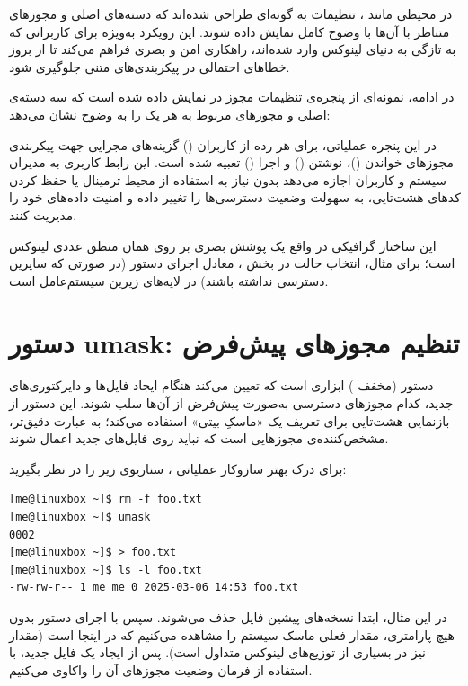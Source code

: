در محیطی مانند ، تنظیمات به گونه‌ای طراحی شده‌اند که دسته‌های اصلی و مجوزهای متناظر با آن‌ها با وضوح کامل نمایش داده شوند. این رویکرد به‌ویژه برای کاربرانی که به تازگی به دنیای لینوکس وارد شده‌اند، راهکاری امن و بصری فراهم می‌کند تا از بروز خطاهای احتمالی در پیکربندی‌های متنی جلوگیری شود.

در ادامه، نمونه‌ای از پنجره‌ی تنظیمات مجوز در  نمایش داده شده است که سه دسته‌ی اصلی و مجوزهای مربوط به هر یک را به وضوح نشان می‌دهد:


در این پنجره عملیاتی، برای هر رده از کاربران () گزینه‌های مجزایی جهت پیکربندی مجوزهای خواندن ()، نوشتن () و اجرا () تعبیه شده است. این رابط کاربری به مدیران سیستم و کاربران اجازه می‌دهد بدون نیاز به استفاده از محیط ترمینال یا حفظ کردن کدهای هشت‌تایی، به سهولت وضعیت دسترسی‌ها را تغییر داده و امنیت داده‌های خود را مدیریت کنند.

این ساختار گرافیکی در واقع یک پوشش بصری بر روی همان منطق عددی لینوکس است؛ برای مثال، انتخاب حالت  در بخش ، معادل اجرای دستور  (در صورتی که سایرین دسترسی نداشته باشند) در لایه‌های زیرین سیستم‌عامل است.

\section{دستور umask: تنظیم مجوزهای پیش‌فرض}

دستور  (مخفف ) ابزاری است که تعیین می‌کند هنگام ایجاد فایل‌ها و دایرکتوری‌های جدید، کدام مجوزهای دسترسی به‌صورت پیش‌فرض از آن‌ها سلب شوند. این دستور از بازنمایی هشت‌تایی برای تعریف یک «ماسکِ بیتی» استفاده می‌کند؛ به عبارت دقیق‌تر،  مشخص‌کننده‌ی مجوزهایی است که نباید روی فایل‌های جدید اعمال شوند.

برای درک بهتر سازوکار عملیاتی ، سناریوی زیر را در نظر بگیرید:

\begin{latin}
\begin{lstlisting}
[me@linuxbox ~]$ rm -f foo.txt
[me@linuxbox ~]$ umask
0002
[me@linuxbox ~]$ > foo.txt
[me@linuxbox ~]$ ls -l foo.txt
-rw-rw-r-- 1 me me 0 2025-03-06 14:53 foo.txt
\end{lstlisting}
\end{latin}

در این مثال، ابتدا نسخه‌های پیشین فایل  حذف می‌شوند. سپس با اجرای دستور  بدون هیچ پارامتری، مقدار فعلی ماسک سیستم را مشاهده می‌کنیم که در اینجا  است (مقدار  نیز در بسیاری از توزیع‌های لینوکس متداول است). پس از ایجاد یک فایل جدید، با استفاده از فرمان  وضعیت مجوزهای آن را واکاوی می‌کنیم.

